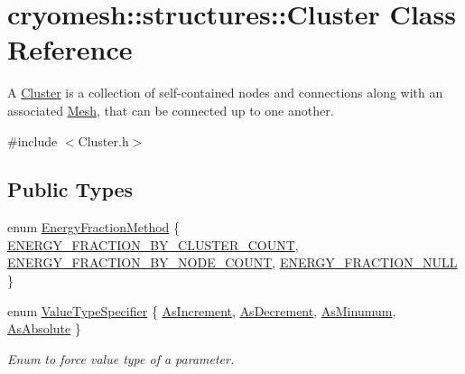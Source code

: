 \hypertarget{classcryomesh_1_1structures_1_1Cluster}{\section{cryomesh\-:\-:structures\-:\-:\-Cluster \-Class \-Reference}
\label{classcryomesh_1_1structures_1_1Cluster}
}


\-A \hyperlink{classcryomesh_1_1structures_1_1Cluster}{\-Cluster} is a collection of self-\/contained nodes and connections along with an associated \hyperlink{classcryomesh_1_1structures_1_1Mesh}{\-Mesh}, that can be connected up to one another.  




{\ttfamily \#include $<$\-Cluster.\-h$>$}

\subsection*{\-Public \-Types}
\begin{DoxyCompactItemize}
\item 
enum \hyperlink{classcryomesh_1_1structures_1_1Cluster_a69c420b79675c6ffc9a0df8381ca9497}{\-Energy\-Fraction\-Method} \{ \hyperlink{classcryomesh_1_1structures_1_1Cluster_a69c420b79675c6ffc9a0df8381ca9497a8e173b3ede8ac61e51f4bdb2a8195c5c}{\-E\-N\-E\-R\-G\-Y\-\_\-\-F\-R\-A\-C\-T\-I\-O\-N\-\_\-\-B\-Y\-\_\-\-C\-L\-U\-S\-T\-E\-R\-\_\-\-C\-O\-U\-N\-T}, 
\hyperlink{classcryomesh_1_1structures_1_1Cluster_a69c420b79675c6ffc9a0df8381ca9497a2ffacc4b354cd88e0d2c6779ec5ca278}{\-E\-N\-E\-R\-G\-Y\-\_\-\-F\-R\-A\-C\-T\-I\-O\-N\-\_\-\-B\-Y\-\_\-\-N\-O\-D\-E\-\_\-\-C\-O\-U\-N\-T}, 
\hyperlink{classcryomesh_1_1structures_1_1Cluster_a69c420b79675c6ffc9a0df8381ca9497a93f1a5c88cbcd70dd3bf5b5622e2bf6e}{\-E\-N\-E\-R\-G\-Y\-\_\-\-F\-R\-A\-C\-T\-I\-O\-N\-\_\-\-N\-U\-L\-L}
 \}
\item 
enum \hyperlink{classcryomesh_1_1structures_1_1Cluster_af2978a9bf2737e5e701600af095ea88f}{\-Value\-Type\-Specifier} \{ \hyperlink{classcryomesh_1_1structures_1_1Cluster_af2978a9bf2737e5e701600af095ea88fa98f7c71ef7e91da5a913638aa7d56945}{\-As\-Increment}, 
\hyperlink{classcryomesh_1_1structures_1_1Cluster_af2978a9bf2737e5e701600af095ea88fa8da8de0be3cbcc34f6ef93a3bdc1e372}{\-As\-Decrement}, 
\hyperlink{classcryomesh_1_1structures_1_1Cluster_af2978a9bf2737e5e701600af095ea88fa8590425d1a96c9ede41311797af2d6b1}{\-As\-Minumum}, 
\hyperlink{classcryomesh_1_1structures_1_1Cluster_af2978a9bf2737e5e701600af095ea88fa3e9eba07f0da7a18f9a7820f987ff82b}{\-As\-Absolute}
 \}
\begin{DoxyCompactList}\small\item\em \-Enum to force value type of a parameter. \end{DoxyCompactList}\end{DoxyCompactItemize}

